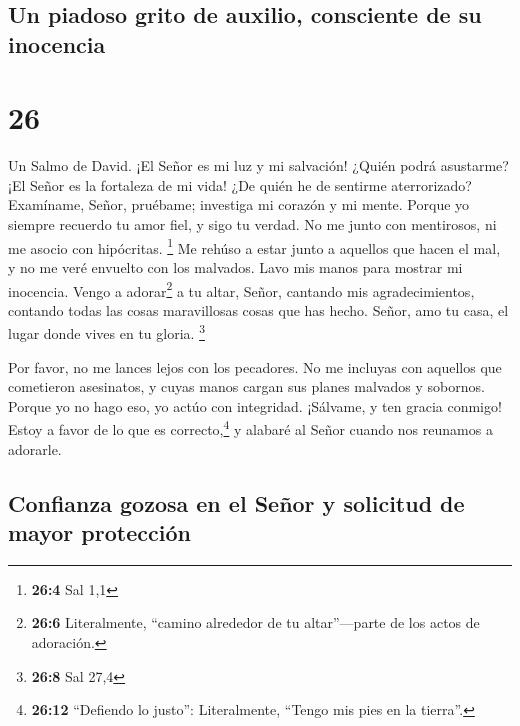 \hypertarget{un-piadoso-grito-de-auxilio-consciente-de-su-inocencia}{%
\subsection{Un piadoso grito de auxilio, consciente de su
inocencia}\label{un-piadoso-grito-de-auxilio-consciente-de-su-inocencia}}

\hypertarget{section-25}{%
\section{26}\label{section-25}}

Un Salmo de David.  ¡El Señor es mi luz y mi salvación!
¿Quién podrá asustarme? ¡El Señor es la fortaleza de mi vida! ¿De quién
he de sentirme aterrorizado?  Examíname, Señor, pruébame;
investiga mi corazón y mi mente.  Porque yo siempre
recuerdo tu amor fiel, y sigo tu verdad.  No me junto con
mentirosos, ni me asocio con hipócritas. \footnote{\textbf{26:4} Sal 1,1}
 Me rehúso a estar junto a aquellos que hacen el mal, y no
me veré envuelto con los malvados.  Lavo mis manos para
mostrar mi inocencia. Vengo a adorar\footnote{\textbf{26:6}
  Literalmente, ``camino alrededor de tu altar''---parte de los actos de
  adoración.} a tu altar, Señor,  cantando mis
agradecimientos, contando todas las cosas maravillosas cosas que has
hecho.  Señor, amo tu casa, el lugar donde vives en tu
gloria. \footnote{\textbf{26:8} Sal 27,4}

 Por favor, no me lances lejos con los pecadores. No me
incluyas con aquellos que cometieron asesinatos,  y cuyas
manos cargan sus planes malvados y sobornos.  Porque yo
no hago eso, yo actúo con integridad. ¡Sálvame, y ten gracia conmigo!
 Estoy a favor de lo que es correcto,\footnote{\textbf{26:12}
  ``Defiendo lo justo'': Literalmente, ``Tengo mis pies en la tierra''.}
y alabaré al Señor cuando nos reunamos a adorarle.

\hypertarget{confianza-gozosa-en-el-seuxf1or-y-solicitud-de-mayor-protecciuxf3n}{%
\subsection{Confianza gozosa en el Señor y solicitud de mayor
protección}\label{confianza-gozosa-en-el-seuxf1or-y-solicitud-de-mayor-protecciuxf3n}}

